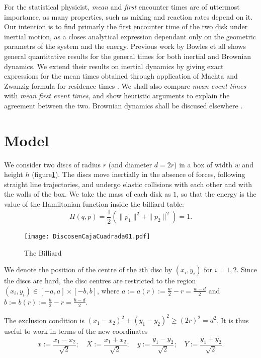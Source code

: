 \documentclass[a4paper,10pt, jcp, aps, preprint]{revtex4-1}
\newcommand{\defeq}{:=}
\begin{document}
For the statistical physicist, \emph{mean} and \emph{first} encounter
times are of uttermost importance, as many properties,
such as mixing and reaction rates depend on it. Our intention is
to find primarly the first encounter time of the two disk under 
inertial motion, as a closes analytical expression dependant only
on the geometric parametrs of the system and the energy. Previous work
by Bowles et all shows general quantitative results for the general times for both
inertial and Brownian dynamics. We extend  their results on
inertial dynamics by giving
exact expressions for the mean times obtained through application of 
Machta and Zwanzig formula for residence times \cite{MacthaZwan}. 
We shall also  compare \emph{mean event times} with \emph{mean first event times},
and show heuristic arguments to explain the agreement between the two. 
Brownian dynamics shall be discused elsewhere \cite{WorkInProgress}.


\section{Model}

We consider two discs of radius $r$ (and diameter $d=2r$) 
in a box of width $w$ and height $h$ (figure\ref{billar01}). 
The discs move inertially in the absence of forces, 
following straight line trajectories,
and undergo elastic collisions with each 
other and with the walls of the box.
We take the mass of each disk as $1$, so that the energy
is the value of the Hamiltonian function inside the billiard table:
\begin{equation}
H(q,p)=\frac{1}{2}(\|p_1\|^2+\|p_2\|^2)=1.
\end{equation}

\begin{figure}[h]
  \centering
  \texttt{[image: DiscosenCajaCuadrada01.pdf]}
  \caption{The Billiard}\label{billar01}
\end{figure}

We denote the position of the centre of the $i$th disc by 
$(x_{i}, y_{i})$ for $i=1,2$. Since the discs are hard, 
the disc centres are restricted to the region 
$(x_i, y_i) \in [-a,a] \times [-b, b]$, where 
$a \defeq a(r) \defeq \frac{w}{2} - r = \frac{w-d}{2}$ and
 $b \defeq b(r) \defeq \frac{h}{2} - r = \frac{h-d}{2}$.


The exclusion condition is $(x_1-x_2)^2 + (y_1-y_2)^2 \ge (2r)^2 = d^2$.
It is thus useful to work in terms of the new coordinates
\begin{equation}\label{cambiocoor01}
 x \defeq \frac{x_1 - x_2}{\sqrt{2}}; 
\quad X \defeq \frac{x_1 + x_2}{\sqrt{2}}; 
\quad y \defeq \frac{y_1 - y_2}{\sqrt{2}}; 
\quad Y \defeq \frac{y_1 + y_2}{\sqrt{2}}.
\end{equation}
\end{document}
